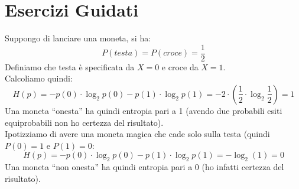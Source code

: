 \section{Esercizi Guidati}
\begin{esempio}
  Suppongo di lanciare una moneta, si ha:
  \[P(testa)=P(croce)=\frac{1}{2}\]
  Definiamo che testa è specificata da $X=0$ e croce da $X=1$.\\
  Calcoliamo quindi:
  \[H(p)=-p(0)\cdot \log_2 p(0)-p(1)\cdot\log_2
    p(1)=-2\cdot(\frac{1}{2}\cdot\log_2\frac{1}{2})=1\] 
  Una moneta ``onesta'' ha quindi entropia pari a 1 (avendo due probabili esiti
  equiprobabili non ho certezza del risultato).\\
  Ipotizziamo di avere una moneta magica che cade solo sulla testa (quindi
  $P(0)=1$ e $P(1)=0$:
  \[H(p)=-p(0)\cdot \log_2 p(0)-p(1)\cdot\log_2 p(1)=-\log_2 (1)=0\]
  Una moneta ``non onesta'' ha quindi entropia pari a 0 (ho infatti certezza del
  risultato).
\end{esempio}
